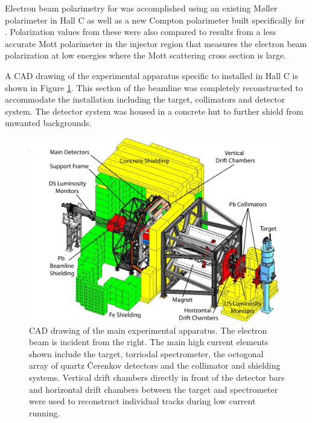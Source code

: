 Electron beam polarimetry for \Qs was accomplished using an existing M\o ller polarimeter in Hall C as well as a new Compton polarimeter built specifically for \Q. Polarization values from these were also compared to results from a less accurate Mott polarimeter in the injector region that measures the electron beam polarization at low energies where the Mott scattering cross section is large.

A CAD drawing of the experimental apparatus specific to \Qs installed in Hall C is shown in Figure \ref{fig:QweakApparatus}. This section of the beamline was completely reconstructed to accommodate the \Qs installation including the target, collimators and detector system. The detector system was housed in a concrete hut to further shield from unwanted backgrounds. 



\begin{figure}[!hhhbb]
\begin{center}
\includegraphics[width=\textwidth]{Pictures/QweakCAD_layout.pdf}
\end{center}
\caption{\label{fig:QweakApparatus}
  CAD drawing of the main \Qs experimental apparatus. The electron beam is incident from the right. The main high current elements shown include the target, torriodal spectrometer, the octogonal array of quartz \v{C}erenkov detectors and the collimator and shielding systems.  Vertical drift chambers directly in front of the detector bars and horizontal drift chambers between the target and spectrometer were used to reconstruct individual tracks during low current running. 
}
\end{figure}

